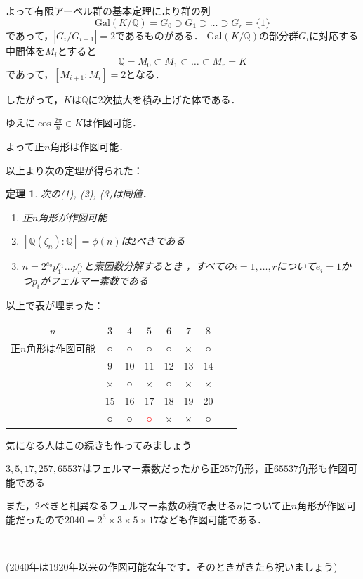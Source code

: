 \documentclass[dvipdfmx,17pt]{beamer}
\theoremstyle{plain}
\newtheorem{thm}{定理}
\newcommand{\Q}{\mathbb{Q}}
\begin{document}
\begin{frame}
よって有限アーベル群の基本定理により群の列
\[\mathrm{Gal}(K/\Q) = G_0 \supset G_1 \supset \dots \supset G_r = \{1\}\]
であって，$|G_i/G_{i+1}| = 2$であるものがある．
$\mathrm{Gal}(K/\Q)$の部分群$G_i$に対応する中間体を$M_i$とすると
\[\Q = M_0 \subset M_1 \subset \dots \subset M_r = K\]
であって，$[M_{i+1}:M_i] = 2$となる．
\end{frame}

\begin{frame}
したがって，$K$は$\Q$に$2$次拡大を積み上げた体である．

ゆえに$\cos \frac{2 \pi}{n} \in K$は作図可能．

よって正$n$角形は作図可能．
\end{frame}

\begin{frame}
以上より次の定理が得られた：
\begin{thm}
次の(1), (2), (3)は同値．
\begin{enumerate}
\item 正$n$角形が作図可能
\item $[\Q(\zeta_n) : \Q] = \phi(n)$は$2$べきである
\item $n = 2^{e_0} p_1^{e_1} \dots p_r^{e_r}$と素因数分解するとき
，すべての$i = 1, \dots, r$について$e_i = 1$かつ$p_i$がフェルマー素数である
\end{enumerate}
\end{thm}
\end{frame}

\begin{frame}
以上で表が埋まった：
\small
\begin{table}[h]
  \begin{tabular}{ccccccccc}
    $n$ & $3$ & $4$ & $5$ & $6$ & $7$ & $8$ \\
    正$n$角形は作図可能 & ○ & ○ & ○ & ○ & × & ○ \\
     & $9$ & $10$ & $11$ & $12$ & $13$ & $14$ \\
     & × & ○ & × & ○ & × & × \\
     & $15$ & $16$ & $17$ & $18$ & $19$ & $20$ \\
     & ○ & ○ & \textcolor{red}{○} & × & × & ○
  \end{tabular}
\end{table}
気になる人はこの続きも作ってみましょう
\end{frame}

\begin{frame}
$3, 5, 17, 257, 65537$はフェルマー素数だったから正$257$角形，正$65537$角形も作図可能である

また，$2$べきと相異なるフェルマー素数の積で表せる$n$について正$n$角形が作図可能だったので$2040 = 2^3 \times 3 \times 5 \times 17$なども作図可能である．
\par　\par
\footnotesize 	(2040年は1920年以来の作図可能な年です．そのときがきたら祝いましょう)
\end{frame}
\end{document}
